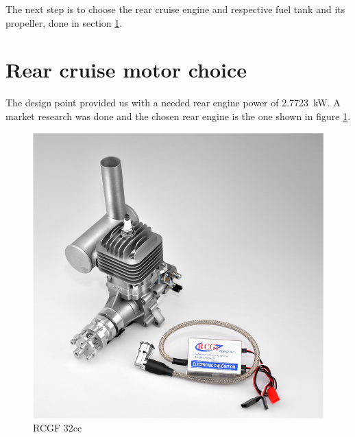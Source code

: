 \documentclass[english,fira]{ist-report}
\begin{document}
The next step is to choose the rear cruise engine and respective fuel tank and its propeller, done in section \ref{sec:motorchoice}.

\section{Rear cruise motor choice}\label{sec:motorchoice}

The design point provided us with a needed rear engine power of \SI{2.7723}{\kilo\watt}. A market research was done and the chosen rear engine is the one shown in figure \ref{fig:rcg32cc}. 

\begin{figure}[!ht]
	\centering
	\includegraphics[width = 0.8\linewidth]{graphics/rcg32cc.jpg}
	\caption{RCGF 32cc}
	\label{fig:rcg32cc}
\end{figure}
\end{document}
